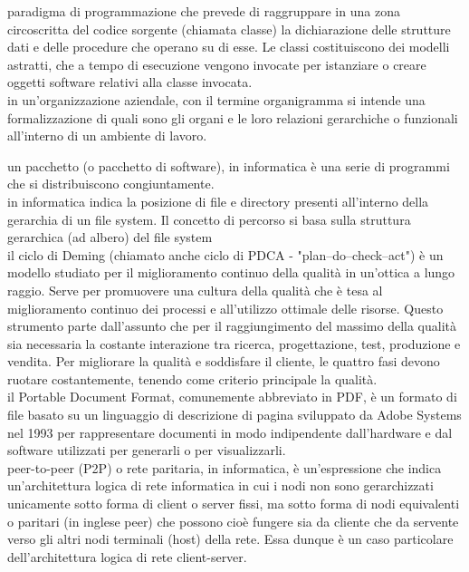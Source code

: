 \documentclass{scalatekids-article}
\begin{document}

   paradigma di programmazione che prevede di raggruppare in una zona circoscritta del codice sorgente (chiamata classe) la dichiarazione delle strutture dati e delle procedure che operano su di esse. Le classi costituiscono dei modelli astratti, che a tempo di esecuzione vengono invocate per istanziare o creare oggetti software relativi alla classe invocata.
  \\

   in un'organizzazione aziendale, con il termine organigramma si intende una formalizzazione di quali sono gli organi e le loro relazioni gerarchiche o funzionali all'interno di un ambiente di lavoro.
  \\


   un pacchetto (o pacchetto di software), in informatica è una serie di programmi che si distribuiscono congiuntamente.
  \\
  
   in informatica indica la posizione di file e directory presenti all'interno della gerarchia di un file system. Il concetto di percorso si basa sulla struttura gerarchica (ad albero) del file system
  \\

   il ciclo di Deming (chiamato anche ciclo di PDCA - "plan–do–check–act") è un modello studiato per il miglioramento continuo della qualità in un'ottica a lungo raggio. Serve per promuovere una cultura della qualità che è tesa al miglioramento continuo dei processi e all'utilizzo ottimale delle risorse. Questo strumento parte dall'assunto che per il raggiungimento del massimo della qualità sia necessaria la costante interazione tra ricerca, progettazione, test, produzione e vendita. Per migliorare la qualità e soddisfare il cliente, le quattro fasi devono ruotare costantemente, tenendo come criterio principale la qualità.
  \\

   il Portable Document Format, comunemente abbreviato in PDF, è un formato di file basato su un linguaggio di descrizione di pagina sviluppato da Adobe Systems nel 1993 per rappresentare documenti in modo indipendente dall'hardware e dal software utilizzati per generarli o per visualizzarli.
  \\

   peer-to-peer (P2P) o rete paritaria, in informatica, è un'espressione che indica un'architettura logica di rete informatica in cui i nodi non sono gerarchizzati unicamente sotto forma di client o server fissi, ma sotto forma di nodi equivalenti o paritari (in inglese peer) che possono cioè fungere sia da cliente che da servente verso gli altri nodi terminali (host) della rete. Essa dunque è un caso particolare dell'architettura logica di rete client-server.
\end{document}
